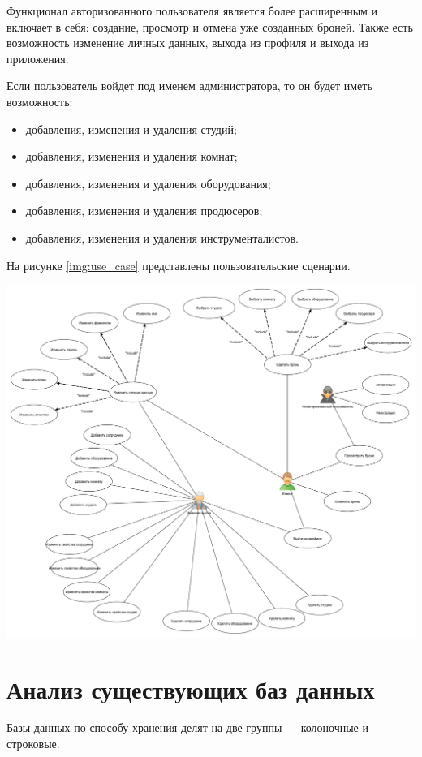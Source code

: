 Функционал авторизованного пользователя является более расширенным и включает в себя: создание, просмотр и отмена уже созданных броней. 
Также есть возможность изменение личных данных, выхода из профиля и выхода из приложения.

Если пользователь войдет под именем администратора, то он будет иметь возможность:
\begin{itemize}
	\item добавления, изменения и удаления студий;
	\item добавления, изменения и удаления комнат;
	\item добавления, изменения и удаления оборудования;
	\item добавления, изменения и удаления продюсеров;
	\item добавления, изменения и удаления инструменталистов.
\end{itemize}
		
На рисунке \ref{img:use_case} представлены пользовательские сценарии.

\begin{center}
	\centering
	\includegraphics[height=0.55\textheight]{inc/img/use_case.pdf}
	\label{img:use_case}
\end{center}



\section{Анализ существующих баз данных}
Базы данных по способу хранения делят на две группы --- колоночные и строковые.

